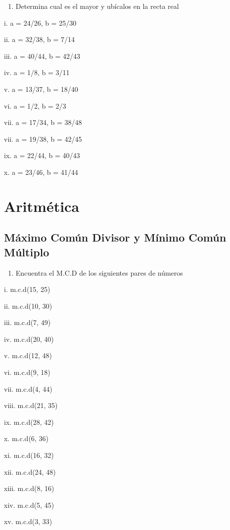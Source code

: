 \documentclass[]{book}
\providecommand{\tightlist}{%
  \setlength{\itemsep}{0pt}\setlength{\parskip}{0pt}}
\begin{document}
\begin{enumerate}
\def\labelenumi{\arabic{enumi}.}
\setcounter{enumi}{3}
\tightlist
\item
  Determina cual es el mayor y ubícalos en la recta real
\end{enumerate}

\begin{multicols}{2}
   
    i. a = 24/26, b = 25/30
   
    ii. a = 32/38, b = 7/14
   
    iii. a = 40/44, b = 42/43
   
    iv. a = 1/8, b = 3/11
   
    v. a = 13/37, b = 18/40
   
    vi. a = 1/2, b = 2/3
   
    vii. a = 17/34, b = 38/48
   
    vii. a = 19/38, b = 42/45
   
    ix. a = 22/44, b = 40/43
   
    x. a = 23/46, b = 41/44
\end{multicols}

\chapter{Aritmética}\label{aritmuxe9tica}

\section{Máximo Común Divisor y Mínimo Común
Múltiplo}\label{muxe1ximo-comuxfan-divisor-y-muxednimo-comuxfan-muxfaltiplo}

\begin{enumerate}
\def\labelenumi{\arabic{enumi}.}
\tightlist
\item
  Encuentra el M.C.D de los siguientes pares de números
\end{enumerate}

\begin{multicols}{2}
  
    i. m.c.d(15, 25)
  
    ii. m.c.d(10, 30)
  
    iii. m.c.d(7, 49)
  
    iv. m.c.d(20, 40)
  
    v. m.c.d(12, 48)
  
    vi. m.c.d(9, 18)
  
    vii. m.c.d(4, 44)
  
    viii. m.c.d(21, 35)
  
    ix. m.c.d(28, 42)
  
    x. m.c.d(6, 36)
  
    xi. m.c.d(16, 32)
  
    xii. m.c.d(24, 48)
  
    xiii. m.c.d(8, 16)
  
    xiv. m.c.d(5, 45)
  
    xv. m.c.d(3, 33)
\end{multicols}
\end{document}

